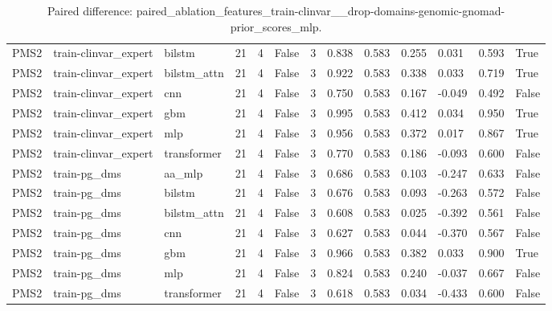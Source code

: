 \begin{table}[t]
\begin{tabular}{lllllllllllll}
PMS2 & train-clinvar\_expert & bilstm & 21 & 4 & False & 3 & 0.838 & 0.583 & 0.255 & 0.031 & 0.593 & True \\
PMS2 & train-clinvar\_expert & bilstm\_attn & 21 & 4 & False & 3 & 0.922 & 0.583 & 0.338 & 0.033 & 0.719 & True \\
PMS2 & train-clinvar\_expert & cnn & 21 & 4 & False & 3 & 0.750 & 0.583 & 0.167 & -0.049 & 0.492 & False \\
PMS2 & train-clinvar\_expert & gbm & 21 & 4 & False & 3 & 0.995 & 0.583 & 0.412 & 0.034 & 0.950 & True \\
PMS2 & train-clinvar\_expert & mlp & 21 & 4 & False & 3 & 0.956 & 0.583 & 0.372 & 0.017 & 0.867 & True \\
PMS2 & train-clinvar\_expert & transformer & 21 & 4 & False & 3 & 0.770 & 0.583 & 0.186 & -0.093 & 0.600 & False \\
PMS2 & train-pg\_dms & aa\_mlp & 21 & 4 & False & 3 & 0.686 & 0.583 & 0.103 & -0.247 & 0.633 & False \\
PMS2 & train-pg\_dms & bilstm & 21 & 4 & False & 3 & 0.676 & 0.583 & 0.093 & -0.263 & 0.572 & False \\
PMS2 & train-pg\_dms & bilstm\_attn & 21 & 4 & False & 3 & 0.608 & 0.583 & 0.025 & -0.392 & 0.561 & False \\
PMS2 & train-pg\_dms & cnn & 21 & 4 & False & 3 & 0.627 & 0.583 & 0.044 & -0.370 & 0.567 & False \\
PMS2 & train-pg\_dms & gbm & 21 & 4 & False & 3 & 0.966 & 0.583 & 0.382 & 0.033 & 0.900 & True \\
PMS2 & train-pg\_dms & mlp & 21 & 4 & False & 3 & 0.824 & 0.583 & 0.240 & -0.037 & 0.667 & False \\
PMS2 & train-pg\_dms & transformer & 21 & 4 & False & 3 & 0.618 & 0.583 & 0.034 & -0.433 & 0.600 & False \\
\bottomrule
\end{tabular}
\caption{Paired difference: paired_ablation_features_train-clinvar__drop-domains-genomic-gnomad-prior_scores_mlp.}
\label{tab:paired_ablation_features_train-clinvar__}
\end{table}